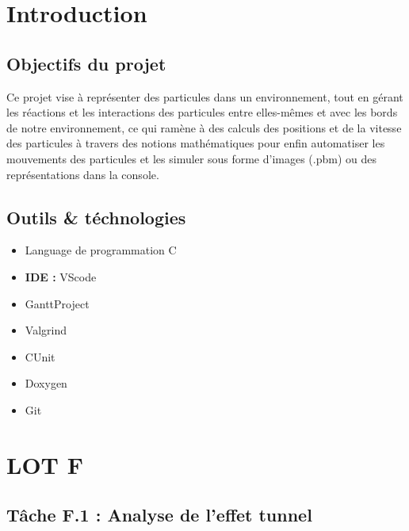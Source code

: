 \documentclass[12pt,a4paper]{report}
\begin{document}
\tableofcontents
\newpage

\chapter{Introduction}

\section{Objectifs du projet}

Ce projet vise à représenter des particules dans un environnement, tout en gérant les réactions et les interactions des particules entre elles-mêmes et avec les bords de notre environnement, ce qui ramène à des calculs des positions et de la vitesse des particules à travers des notions mathématiques pour enfin automatiser les mouvements des particules et les simuler sous forme d'images (.pbm) ou des représentations dans la console.

\section{Outils \& téchnologies}

\begin{itemize}
    \item Language de programmation C
    \item \textbf{IDE : } VScode
    \item GanttProject
    \item Valgrind
    \item CUnit
    \item Doxygen
    \item Git
\end{itemize}

\chapter{LOT F}

\section{Tâche F.1 : Analyse de l'effet tunnel}
\end{document}
